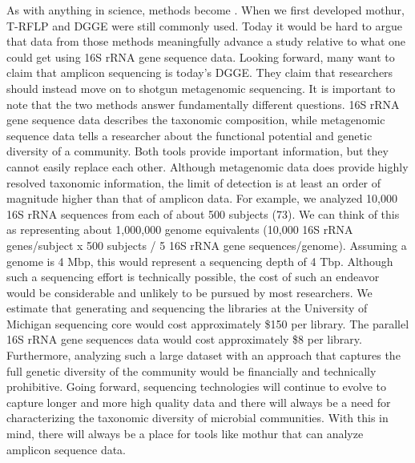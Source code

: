 \documentclass[11pt,]{article}
\begin{document}
As with anything in science, methods become . When we
first developed mothur, T-RFLP and DGGE were still commonly used. Today
it would be hard to argue that data from those methods meaningfully
advance a study relative to what one could get using 16S rRNA gene
sequence data. Looking forward, many want to claim that amplicon
sequencing is today's DGGE. They claim that researchers should instead
move on to shotgun metagenomic sequencing. It is important to note that
the two methods answer fundamentally different questions. 16S rRNA gene
sequence data describes the taxonomic composition, while metagenomic
sequence data tells a researcher about the functional potential and
genetic diversity of a community. Both tools provide important
information, but they cannot easily replace each other. Although
metagenomic data does provide highly resolved taxonomic information, the
limit of detection is at least an order of magnitude higher than that of
amplicon data. For example, we analyzed 10,000 16S rRNA sequences from
each of about 500 subjects (73). We can think of this as representing
about 1,000,000 genome equivalents (10,000 16S rRNA genes/subject x 500
subjects / 5 16S rRNA gene sequences/genome). Assuming a genome is 4
Mbp, this would represent a sequencing depth of 4 Tbp. Although such a
sequencing effort is technically possible, the cost of such an endeavor
would be considerable and unlikely to be pursued by most researchers. We
estimate that generating and sequencing the libraries at the University
of Michigan sequencing core would cost approximately \$150 per library.
The parallel 16S rRNA gene sequences data would cost approximately \$8
per library. Furthermore, analyzing such a large dataset with an
approach that captures the full genetic diversity of the community would
be financially and technically prohibitive. Going forward, sequencing
technologies will continue to evolve to capture longer and more high
quality data and there will always be a need for characterizing the
taxonomic diversity of microbial communities. With this in mind, there
will always be a place for tools like mothur that can analyze amplicon
sequence data.
\end{document}
